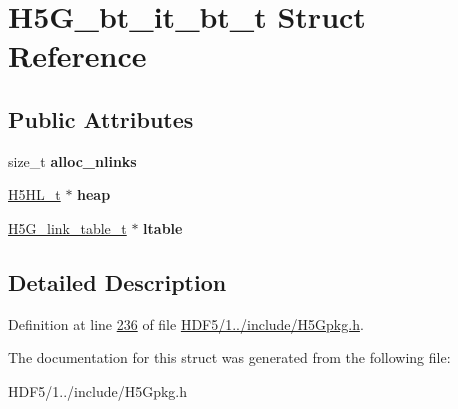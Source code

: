 \hypertarget{struct_h5_g__bt__it__bt__t}{}\section{H5\+G\+\_\+bt\+\_\+it\+\_\+bt\+\_\+t Struct Reference}
\label{struct_h5_g__bt__it__bt__t}
\subsection*{Public Attributes}
\begin{DoxyCompactItemize}
\item 
\mbox{\label{struct_h5_g__bt__it__bt__t_ae918267510adfd212d0d76ea719180b7}} 
size\+\_\+t {\bfseries alloc\+\_\+nlinks}
\item 
\mbox{\label{struct_h5_g__bt__it__bt__t_a6033eb93ab91920b9700e12bfa3183db}} 
\hyperlink{struct_h5_h_l__t}{H5\+H\+L\+\_\+t} $\ast$ {\bfseries heap}
\item 
\mbox{\label{struct_h5_g__bt__it__bt__t_a74a6062da61877c4519984c9e97484b4}} 
\hyperlink{struct_h5_g__link__table__t}{H5\+G\+\_\+link\+\_\+table\+\_\+t} $\ast$ {\bfseries ltable}
\end{DoxyCompactItemize}


\subsection{Detailed Description}


Definition at line \hyperlink{_h_d_f5_21_810_81_2include_2_h5_gpkg_8h_source_l00236}{236} of file \hyperlink{_h_d_f5_21_810_81_2include_2_h5_gpkg_8h_source}{H\+D\+F5/1../include/\+H5\+Gpkg.\+h}.



The documentation for this struct was generated from the following file\+:\begin{DoxyCompactItemize}
\item 
H\+D\+F5/1../include/\+H5\+Gpkg.\+h\end{DoxyCompactItemize}
